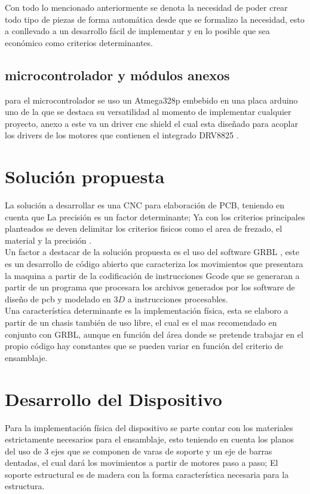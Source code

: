 \documentclass[conference]{IEEEtran}
\begin{document}
Con todo lo mencionado anteriormente se denota la necesidad de poder crear todo tipo de piezas de forma automática desde que se formalizo la necesidad, esto a conllevado a un desarrollo fácil de implementar y en lo posible que sea económico como criterios determinantes. 





\subsection{microcontrolador y módulos anexos}
para el microcontrolador se uso un Atmega328p \cite{micro} embebido en una placa arduino uno \cite{arduino} de la que se destaca su versatilidad al momento de implementar cualquier proyecto, anexo a este va un driver cnc shield \cite{shield} el cual esta diseñado para acoplar los drivers de los motores que contienen el integrado DRV8825 \cite{pololu}.


% 

\section{Solución propuesta}
La solución a desarrollar es una CNC para elaboración de PCB, teniendo en cuenta que La precisión es un factor determinante; Ya con los criterios principales planteados se deven delimitar los criterios fisicos como el area de frezado, el material y la precisión .\\ 
Un factor a destacar de la solución propuesta es el uso del software GRBL \cite{b13} \cite{GRBL}, este es un desarrollo de código abierto que caracteriza los movimientos que presentara la maquina a partir de la codificación de instrucciones Gcode que se generaran a partir de un programa que procesara los archivos generados por los software de diseño de pcb y modelado en $3 D$ a instrucciones procesables.\\ 
Una característica determinante es la implementación física, esta se elaboro a partir de un chasis también de uso libre, el cual es el mas recomendado en conjunto con GRBL, aunque en función del área donde se pretende trabajar en el propio código hay constantes que se pueden variar en función del criterio de ensamblaje.


\section{Desarrollo del Dispositivo}
Para la implementación física del dispositivo se parte contar con los materiales estrictamente necesarios para el ensamblaje, esto teniendo en cuenta los planos del uso de 3 ejes que se componen de varas de soporte y un eje de barras dentadas, el cual dará los movimientos a partir de motores paso a paso; El soporte estructural es de madera con la forma característica necesaria para la estructura. 
\end{document}
